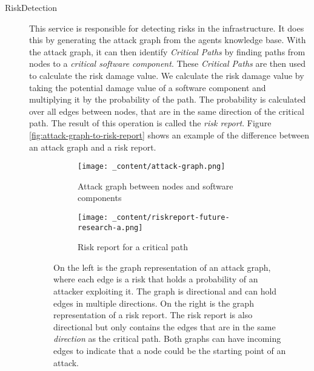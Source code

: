 \begin{description}
    \item[RiskDetection] This service is responsible for detecting risks in the infrastructure. It does this by generating the attack graph from the agents knowledge base. With the attack graph, it can then identify \textit{Critical Paths} by finding paths from nodes to a \textit{critical software component}. These \textit{Critical Paths} are then used to calculate the risk damage value. We calculate the risk damage value by taking the potential damage value of a software component and multiplying it by the probability of the path. The probability is calculated over all edges between nodes, that are in the same direction of the critical path. The result of this operation is called the \emph{risk report}. Figure \ref{fig:attack-graph-to-risk-report} shows an example of the difference between an attack graph and a risk report.
    
    \begin{figure}[H]
        \label{fig:attack-graph-to-risk-report}
        \centering
        \begin{subfigure}[b]{0.4\textwidth}
            \centering
            \texttt{[image: \_content/attack-graph.png]}
            \caption{Attack graph between nodes and software components}
            \label{fig:attack-graph}
        \end{subfigure}
        \hspace{0.5cm}
        \centering
        \begin{subfigure}[b]{0.4\textwidth}
            \centering
            \texttt{[image: \_content/riskreport-future-research-a.png]}
            \caption{Risk report for a critical path}
            \label{fig:risk-report}
        \end{subfigure}
        \caption{On the left is the graph representation of an attack graph, where each edge is a risk that holds a probability of an attacker exploiting it. The graph is directional and can hold edges in multiple directions. On the right is the graph representation of a risk report. The risk report is also directional but only contains the edges that are in the same \textit{direction} as the critical path. Both graphs can have incoming edges to indicate that a node could be the starting point of an attack.}
    \end{figure}


\end{description}
